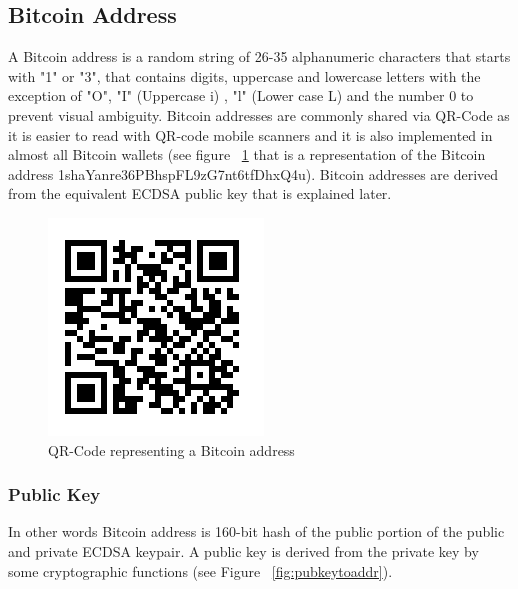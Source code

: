 \subsection{Bitcoin Address}
A Bitcoin address is a random string of 26-35 alphanumeric characters that starts with "1" or "3", that contains digits, uppercase and lowercase letters with the exception of "O", "I" (Uppercase i) , "l" (Lower case L) and the number 0 to prevent visual ambiguity. Bitcoin addresses are commonly shared via QR-Code as it is easier to read with QR-code mobile scanners and it is also implemented in almost all Bitcoin wallets (see figure ~\ref{fig:Bitcoinqr} that is a representation of the Bitcoin address 1shaYanre36PBhspFL9zG7nt6tfDhxQ4u). Bitcoin addresses are derived from the equivalent ECDSA public key that is explained later.

\begin{figure}
\centering
\includegraphics[scale=0.8]{fig/Bitcoinqr.png}
  \caption{QR-Code representing a Bitcoin address}
\label{fig:Bitcoinqr}
\end{figure}

\subsubsection{Public Key}
 In other words Bitcoin address is 160-bit hash of the public portion of the public and private ECDSA keypair. A public key is derived from the private key by some cryptographic functions (see Figure ~\ref{fig:pubkeytoaddr}). 

